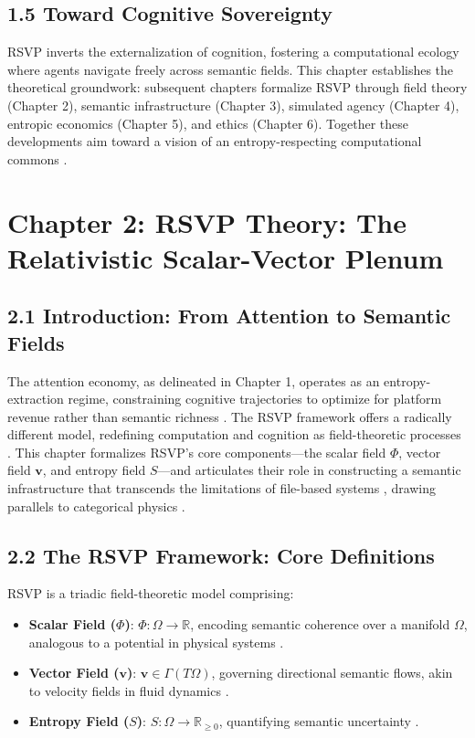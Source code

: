 \documentclass[12pt]{article}
\begin{document}
\subsection{1.5 Toward Cognitive Sovereignty}

RSVP inverts the externalization of cognition, fostering a computational ecology where agents navigate freely across semantic fields. This chapter establishes the theoretical groundwork: subsequent chapters formalize RSVP through field theory (Chapter 2), semantic infrastructure (Chapter 3), simulated agency (Chapter 4), entropic economics (Chapter 5), and ethics (Chapter 6). Together these developments aim toward a vision of an entropy-respecting computational commons \citep{atiyah1969, milewski2018}.

\section{Chapter 2: RSVP Theory: The Relativistic Scalar-Vector Plenum}

\subsection{2.1 Introduction: From Attention to Semantic Fields}

The attention economy, as delineated in Chapter 1, operates as an entropy-extraction regime, constraining cognitive trajectories to optimize for platform revenue rather than semantic richness \citep{zuboff2019, lanier2018}. The RSVP framework offers a radically different model, redefining computation and cognition as field-theoretic processes \citep{gromov1999}. This chapter formalizes RSVP’s core components—the scalar field \(\Phi\), vector field \(\mathbf{v}\), and entropy field \(S\)—and articulates their role in constructing a semantic infrastructure that transcends the limitations of file-based systems \citep{bird1988}, drawing parallels to categorical physics \citep{baez2011}.

\subsection{2.2 The RSVP Framework: Core Definitions}

RSVP is a triadic field-theoretic model comprising:
\begin{itemize}
    \item \textbf{Scalar Field (\(\Phi\))}: \(\Phi: \Omega \to \mathbb{R}\), encoding semantic coherence over a manifold \(\Omega\), analogous to a potential in physical systems \citep{gromov1999}.
    \item \textbf{Vector Field (\(\mathbf{v}\))}: \(\mathbf{v} \in \Gamma(T\Omega)\), governing directional semantic flows, akin to velocity fields in fluid dynamics \citep{baez2011}.
    \item \textbf{Entropy Field (\(S\))}: \(S: \Omega \to \mathbb{R}_{\geq 0}\), quantifying semantic uncertainty \citep{shannon1948}.
\end{itemize}
\end{document}
